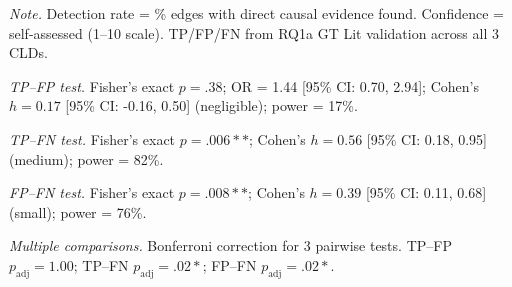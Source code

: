 \begin{table}[H]
\centering
\begin{minipage}{\linewidth}
\centering
\caption{Deep Research Detection Rate and Discrimination Analysis (n=285 edges)}
\label{tab:rq3_results}
\begin{threeparttable}
\end{threeparttable}
\vspace{0.5em}
\footnotesize
\textit{Note.} Detection rate = \% edges with direct causal evidence found. Confidence = self-assessed (1--10 scale). TP/FP/FN from RQ1a GT Lit validation across all 3 CLDs.\par
\textit{TP--FP test.} Fisher's exact $p=.38$; OR = 1.44 [95\% CI: 0.70, 2.94]; Cohen's $h=0.17$ [95\% CI: -0.16, 0.50] (negligible); power = 17\%.\par
\textit{TP--FN test.} Fisher's exact $p=.006**$; Cohen's $h=0.56$ [95\% CI: 0.18, 0.95] (medium); power = 82\%.\par
\textit{FP--FN test.} Fisher's exact $p=.008**$; Cohen's $h=0.39$ [95\% CI: 0.11, 0.68] (small); power = 76\%.\par
\textit{Multiple comparisons.} Bonferroni correction for 3 pairwise tests. TP--FP $p_{\text{adj}}=1.00$; TP--FN $p_{\text{adj}}=.02*$; FP--FN $p_{\text{adj}}=.02*$.

\end{minipage}
\end{table}
